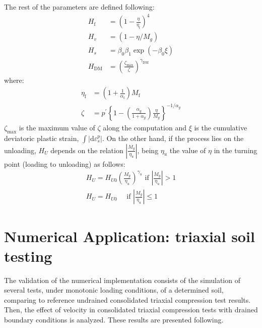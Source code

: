 \documentclass[preprint,12pt,a4paper]{elsarticle}
\begin{document}
The rest of the parameters are defined following:
\begin{equation}
\begin{aligned} H_{\mathrm{f}} &=\left(1-\frac{\eta}{\eta_{\mathrm{f}}}\right)^{4} \\ 
H_{v} &=\left(1-\eta / M_{g}\right) \\ 
H_{s} &=\beta_{0} \beta_{1} \exp \left(-\beta_{0} \xi\right) \\ 
H_{\mathrm{DM}} &=\left(\frac{\zeta_{\mathrm{max}}}{\zeta}\right)^{\gamma_{\mathrm{DM}}} \end{aligned}
\end{equation}
where:
\begin{equation}
\begin{aligned} 
\eta_{\mathrm{f}} &=\left(1+\frac{1}{\alpha_{\mathrm{f}}}\right) M_{\mathrm{f}} \\ 
\zeta &=p^{\prime}\left\{1-\left(\frac{\alpha_{g}}{1+\alpha_{g}}\right) \frac{\eta}{M_{g}}\right\}^{-1 / \alpha_{g}} \end{aligned}
\end{equation}
$\zeta_{\mathrm{max}}$ is the maximum value of $\zeta$ along the computation and $\xi$ is the cumulative deviatoric plastic strain, $\int\left|\mathrm{d} \varepsilon_{s}^{p}\right| $. On the other hand, if the process lies on the unloading, $H_U$ depends on the relation $\left|\frac{M_{g}}{\eta_{u}}\right|$, being $\eta_{u}$ the value of $\eta$ in the turning point (loading to unloading) as follows:
\begin{equation}
\begin{array}{c}{H_{U}=H_{U 0}\left(\frac{M_{g}}{\eta_{u}}\right)^{\gamma_{u}} \text { if }\left|\frac{M_{g}}{\eta_{u}}\right|>1} \\ 
{H_{U}=H_{U 0} \quad \text { if }\left|\frac{M_{g}}{\eta_{u}}\right| \leqslant 1}\end{array}
\end{equation}



\section{Numerical Application: triaxial soil testing}
\label{sec:4}
The validation of the numerical implementation consists of the simulation of several tests, under monotonic loading conditions, of a determined soil, comparing to reference undrained consolidated triaxial compression test results. Then, the effect of velocity in consolidated triaxial compression tests with drained boundary conditions is analyzed. These results are presented following.
\end{document}
